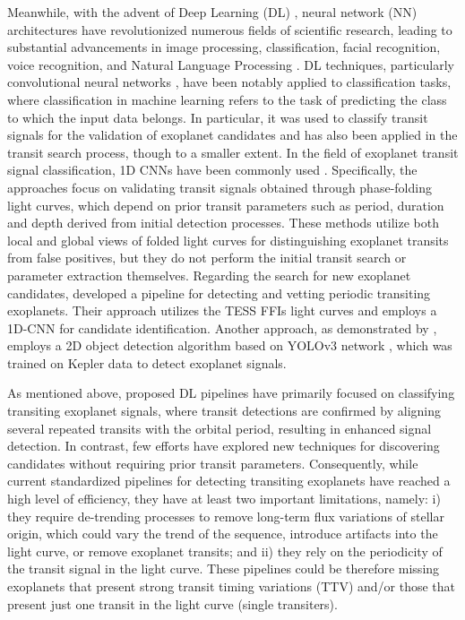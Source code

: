 Meanwhile, with the advent of Deep Learning (DL) \cite {lecun2015deep}, neural network (NN) architectures have revolutionized numerous fields of scientific research, leading to substantial advancements in image processing, classification, facial recognition, voice recognition, and Natural Language Processing \cite[NLP;][]{krizhevsky2017imagenet, ciregan2012multi, he2016deep, voulodimos2018deep, vaswani2017attention}. DL techniques, particularly convolutional neural networks \citep[CNN;][]{krizhevsky2012imagenet}, have been notably applied to classification tasks, where classification in machine learning refers to the task of predicting the class to which the input data belongs. In particular, it was used to classify transit signals for the validation of exoplanet candidates and has also been applied in the transit search process, though to a smaller extent. In the field of exoplanet transit signal classification, 1D CNNs have been commonly used \citep[e.g.][]{osborn2020rapid, rao2021nigraha, tey2023identifying}. Specifically, the approaches focus on validating transit signals obtained through phase-folding light curves, which depend on prior transit parameters such as period, duration and depth derived from initial detection processes. These methods utilize both local and global views of folded light curves for distinguishing exoplanet transits from false positives, but they do not perform the initial transit search or parameter extraction themselves. Regarding the search for new exoplanet candidates, \cite{olmschenk2021identifying} developed a pipeline for detecting and vetting periodic transiting exoplanets. Their approach utilizes the TESS FFIs light curves and employs a 1D-CNN for candidate identification. Another approach, as demonstrated by \cite{cui2021identify}, employs a 2D object detection algorithm based on YOLOv3 network \citep{redmon2018yolov3incrementalimprovement}, which was trained on Kepler data to detect exoplanet signals. \par


As mentioned above, proposed DL pipelines have primarily focused on classifying transiting exoplanet signals, where transit detections are confirmed by aligning several repeated transits with the orbital period, resulting in enhanced signal detection. In contrast, few efforts have explored new techniques for discovering candidates without requiring prior transit parameters. Consequently, while current standardized pipelines for detecting transiting exoplanets have reached a high level of efficiency, they have at least two important limitations, namely: i) they require de-trending processes to remove long-term flux variations of stellar origin, which could vary the trend of the sequence, introduce artifacts into the light curve, or remove exoplanet transits; and ii) they rely on the periodicity of the transit signal in the light curve. These pipelines could be therefore missing exoplanets that present strong transit timing variations (TTV) and/or those that present just one transit in the light curve (single transiters). \par


